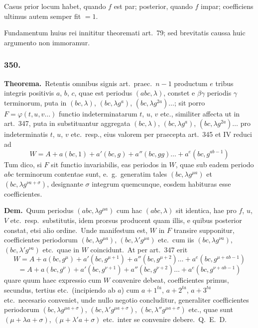 \documentclass[12pt,a4paper]{article}
\theoremstyle{plain}
\theoremstyle{definition}
\theoremstyle{remark}
\begin{document}
Casus prior locum habet, quando $f$ est par; posterior, quando $f$
impar; coefficiens ultimus autem semper fit $=1$.

Fundamentum huius rei innititur theoremati art.\ 79; sed brevitatis
caussa huic argumento non immoramur.

\subsubsection*{350.}

\textbf{Theorema.}\ Retentis omnibus signis art.\ praec.\ $n-1$ productum
$e$ tribus integris positivis $a$, $b$, $c$, quae est periodus $(abc,\lambda)$,
constet e $\beta\gamma$ periodis $\gamma$ terminorum, puta in $(bc,\lambda)$,
$(bc,\lambda g^a)$, $(bc,\lambda g^{2a})\dots$; sit porro $F=\varphi(t,u,v\dots)$ functio
indeterminatarum $t$, $u$, $v$ etc., similiter affecta ut in art.\ 347, puta in
substituantur aggregata $(bc,\lambda)$, $(bc,\lambda g^a)$, $(bc,\lambda g^{2a})\dots$
pro indeterminatis $t$, $u$, $v$ etc.\ resp., eius valorem per praecepta art.\ 345
et IV reduci ad
\[W = A+a(bc,1)+a'(bc,g)+a''(bc,gg)\dots+a^e(bc,g^{ab-1})\]
Tum dico, si $F$ sit functio invariabilis, eas periodos in $W$, quae sub eadem
periodo $abc$ terminorum contentae sunt, e.\ g.\ generatim tales
$(bc,\lambda g^{\mu a})$ et $(bc,\lambda g^{\nu a+\sigma})$, designante $\sigma$ integrum quemcunque,
eosdem habituras esse coefficientes.

\textbf{Dem.}\ Quum periodus $(abc,\lambda g^{\mu a})$ cum hac $(abc,\lambda)$ sit
identica, hae pro $f$, $u$, $V$ etc.\ resp.\ substitutis, idem prorsus
producent quam illis, e quibus posterior constat, etsi alio ordine.\ Unde
manifestum est, $W$ in $F$ transire supponitur, coefficientes periodorum
$(bc,\lambda g^{\mu a})$, $(bc,\lambda' g^{\mu a})$ etc.\ cum iis $(bc,\lambda g^{\nu a})$,
$(bc,\lambda' g^{\nu a})$ etc.\ quae in $W$ coincidunt.\ At per art.\ 347 erit
\[W = A+a(bc,g^\mu)+a'(bc,g^{\mu+1})+a''(bc,g^{\mu+2})\dots+a^e(bc,g^{\mu+ab-1})\]
\[= A+a(bc,g^\nu)+a'(bc,g^{\nu+1})+a''(bc,g^{\nu+2})\dots+a^e(bc,g^{\nu+ab-1})\]
quare quum haec expressio cum $W$ convenire debeat, coefficientes
primus, secundus, tertius etc.\ (incipiendo ab $a$) cum
$a+1^{ta}$, $a+2^{ta}$, $a+3^{ta}$ etc.\ necesario conveniet, unde nullo negotio
concluditur, generaliter coefficientes periodorum
$(bc,\lambda g^{\mu a+\sigma})$, $(bc,\lambda' g^{\mu a+\sigma})$, $(bc,\lambda'' g^{\mu a+\sigma})$ etc.,
quae sunt $(\mu+\lambda a+\sigma)$, $(\mu+\lambda' a+\sigma)$ etc.\ inter se
convenire debere.\ Q.\ E.\ D.
\end{document}

